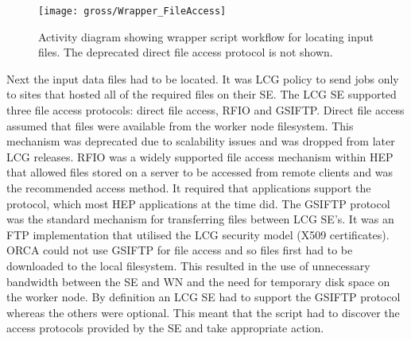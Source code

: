 
\begin{figure}[!tb]
  \centering
  \texttt{[image: gross/Wrapper\_FileAccess]}
  \caption{Activity diagram showing wrapper script workflow for locating input files. The deprecated direct file access protocol is not shown.
  \label{fig:Wrapper_fileAccess}}
\end{figure}

Next the input data files had to be located. It was LCG policy to send jobs only to sites that hosted all of the required files on their SE. The LCG SE supported three file access protocols: direct file access, RFIO and GSIFTP. Direct file access assumed that files were available from the worker node filesystem. This mechanism was deprecated due to scalability issues and was dropped from later LCG releases. RFIO was a widely supported file access mechanism within HEP that allowed files stored on a server to be accessed from remote clients and was the recommended access method. It required that applications support the protocol, which most HEP applications at the time did. The GSIFTP protocol was the standard mechanism for transferring files between LCG SE's. It was an FTP implementation that utilised the LCG security model (X509 certificates). ORCA could not use GSIFTP for file access and so files first had to be downloaded to the local filesystem. This resulted in the use of unnecessary bandwidth between the SE and WN and the need for temporary disk space on the worker node. By definition an LCG SE had to support the GSIFTP protocol whereas the others were optional. This meant that the script had to discover the access protocols provided by the SE and take appropriate action.

